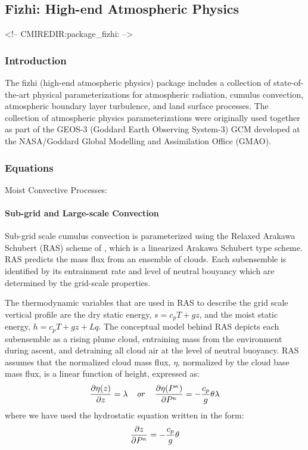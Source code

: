 \subsection{Fizhi: High-end Atmospheric Physics}
\label{sec:pkg:fizhi}
\begin{rawhtml}
<!-- CMIREDIR:package_fizhi: -->
\end{rawhtml}


\subsubsection{Introduction}
The fizhi (high-end atmospheric physics) package includes a collection of state-of-the-art
physical parameterizations for atmospheric radiation, cumulus convection, atmospheric
boundary layer turbulence, and land surface processes. The collection of atmospheric
physics parameterizations were originally used together as part of the GEOS-3
(Goddard Earth Observing System-3) GCM developed at the NASA/Goddard Global Modelling
and Assimilation Office (GMAO).

 
\subsubsection{Equations}

Moist Convective Processes:

\paragraph{Sub-grid and Large-scale Convection}
\label{sec:fizhi:mc}

Sub-grid scale cumulus convection is parameterized using the Relaxed Arakawa
Schubert (RAS) scheme of \cite{moorsz:92}, which is a linearized Arakawa Schubert
type scheme.  RAS predicts the mass flux from an ensemble of clouds.  Each subensemble is identified
by its entrainment rate and level of neutral bouyancy which are determined by the grid-scale properties.

The thermodynamic variables that are used in RAS to describe the grid scale vertical profile are
the dry static energy, $s=c_pT +gz$, and the moist static energy, $h=c_p T + gz + Lq$. 
The conceptual model behind RAS depicts each subensemble as a rising plume cloud, entraining 
mass from the environment during ascent, and detraining all cloud air at the level of neutral 
buoyancy. RAS assumes that the normalized cloud mass flux, $\eta$, normalized by the cloud base 
mass flux, is a linear function of height, expressed as:
\[
\frac{\partial \eta(z)}{\partial z} = \lambda \hspace{0.4cm}or\hspace{0.4cm} \frac{\partial \eta(P^{\kappa})}{\partial P^{\kappa}} = 
-\frac{c_p}{g}\theta\lambda
\]
where we have used the hydrostatic equation written in the form:
\[
\frac{\partial z}{\partial P^{\kappa}} = -\frac{c_p}{g}\theta
\]

